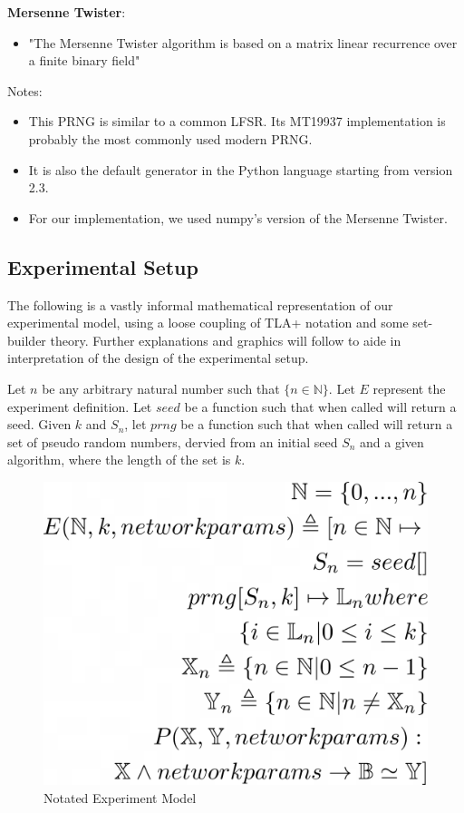 \documentclass[conference]{IEEEtran}
\begin{document}
\noindent\textbf{Mersenne Twister}:
\begin{itemize}
    \item "The Mersenne Twister algorithm is based on a matrix linear recurrence over a finite binary field" \cite{10.1145/146382.146383}
\end{itemize}
Notes:
\begin{itemize}
    \item This PRNG is similar to a common LFSR. Its MT19937 implementation is probably the most commonly used modern PRNG. 
    \item It is also the default generator in the Python language starting from version 2.3. 
    \item For our implementation, we used numpy's version of the Mersenne Twister.
\end{itemize}


\subsection{Experimental Setup}


The following is a vastly informal mathematical representation of our experimental model, using a loose coupling of TLA+ notation and some set-builder theory. Further explanations and graphics will follow to aide in interpretation of the design of the experimental setup.

\begin{displayquote}
Let $n$ be any arbitrary natural number such that $\{n \in \mathbb{N}\}$.
Let $E$ represent the experiment definition.
Let $seed$ be a function such that when called will return a seed.
Given $k$ and $S_n$, let $prng$ be a function such that when called will return a set of pseudo random numbers,
dervied from an initial seed $S_n$ and a given algorithm, where the length of the set is $k$.
\end{displayquote}

\begin{figure}[H]
\centering
\includegraphics[width=.5\linewidth]{./Images/ModelNotated.png}
\caption{Notated Experiment Model}
\label{fig:Notated Experiment Model}
\end{figure}
\end{document}
